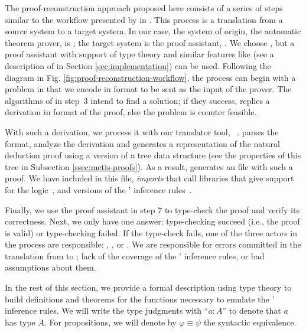 \documentclass[../main.tex]{subfiles}
\begin{document}
The proof-reconstruction approach proposed here consists of a series
of steps similar to the workflow presented by \citeauthor{sultana2015} in
\cite{sultana2015}. This process is a translation from a source
system to a target system. In our case, the system of origin, the
automatic theorem prover, is \Metis; the target system is the proof
assistant, \Agda. We choose \Agda, but a proof assistant with
support of type theory and similar features like \Agda
(see a description of \Agda in Section
\ref{sec:implementation}) can be used.
Following the diagram in Fig.
\ref{fig:proof-reconstruction-workflow}, the process can begin with
a problem in \CPL that we encode in \TPTP format to be sent as the
input of the \Metis prover.
The algorithms of \Metis in step~3 intend to find
a solution; if they success, \Metis replies a derivation in \TSTP
format of the proof, else the problem is counter feasible.

With such a derivation, we process it with our \Haskell translator
tool, \Athena~\cite{Athena}.
\Athena parses the \TSTP format, analyze the
derivation and generates a representation of the natural deduction
proof using a version of a tree data structure (see the properties
of this tree in Subsection \ref{ssec:metis-proofs}). As a result,
\Athena generates an \Agda file with such a proof. We have included
in this file, \emph{imports} that call \Agda libraries that give
support for the logic~\cite{AgdaProp}, and versions of the \Metis'
inference rules~\cite{AgdaMetis}.

Finally, we use the proof assistant in step 7 to type-check the
proof and verify its correctness. Next, we only have one answer:
type-checking succeed (i.e., the proof is valid) or type-checking
failed.
If the type-check fails, one of the three actors in the process are
responsible: \Metis, \Athena, or \Agda. We are responsible for
errors committed in the translation from \TSTP to \Agda; lack of the
coverage of the \Metis' inference rules, or bad assumptions about
them. 

In the rest of this section, we provide a formal description using
type theory to build definitions and theorems for the functions
necessary to emulate the \Metis' inference rules. We will write the
type judgments with ``$a : A$'' to denote that $a$ has type $A$.
For propositions, we will denote by $φ ≡ ψ$ the syntactic
equivalence.


\end{document}
